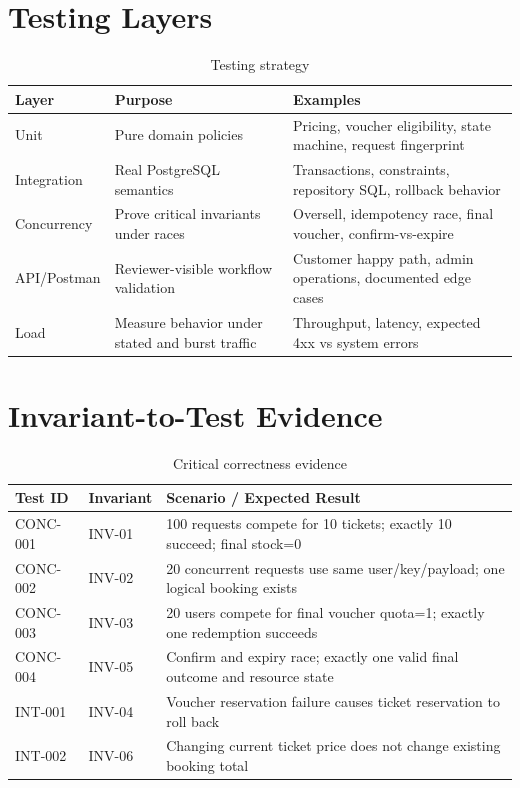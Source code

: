 \section{Testing Layers}
\begin{table}[H]
\centering
\caption{Testing strategy}
\begin{tabularx}{\textwidth}{p{}YY}
\toprule
\textbf{Layer} & \textbf{Purpose} & \textbf{Examples} \\
\midrule
Unit & Pure domain policies & Pricing, voucher eligibility, state machine, request fingerprint \\
Integration & Real PostgreSQL semantics & Transactions, constraints, repository SQL, rollback behavior \\
Concurrency & Prove critical invariants under races & Oversell, idempotency race, final voucher, confirm-vs-expire \\
API/Postman & Reviewer-visible workflow validation & Customer happy path, admin operations, documented edge cases \\
Load & Measure behavior under stated and burst traffic & Throughput, latency, expected 4xx vs system errors \\
\bottomrule
\end{tabularx}
\end{table}

\section{Invariant-to-Test Evidence}
\begin{table}[H]
\centering
\caption{Critical correctness evidence}
\begin{tabularx}{\textwidth}{p{}p{}Y}
\toprule
\textbf{Test ID} & \textbf{Invariant} & \textbf{Scenario / Expected Result} \\
\midrule
CONC-001 & INV-01 & 100 requests compete for 10 tickets; exactly 10 succeed; final stock=0 \\
CONC-002 & INV-02 & 20 concurrent requests use same user/key/payload; one logical booking exists \\
CONC-003 & INV-03 & 20 users compete for final voucher quota=1; exactly one redemption succeeds \\
CONC-004 & INV-05 & Confirm and expiry race; exactly one valid final outcome and resource state \\
INT-001 & INV-04 & Voucher reservation failure causes ticket reservation to roll back \\
INT-002 & INV-06 & Changing current ticket price does not change existing booking total \\
\bottomrule
\end{tabularx}
\end{table}

